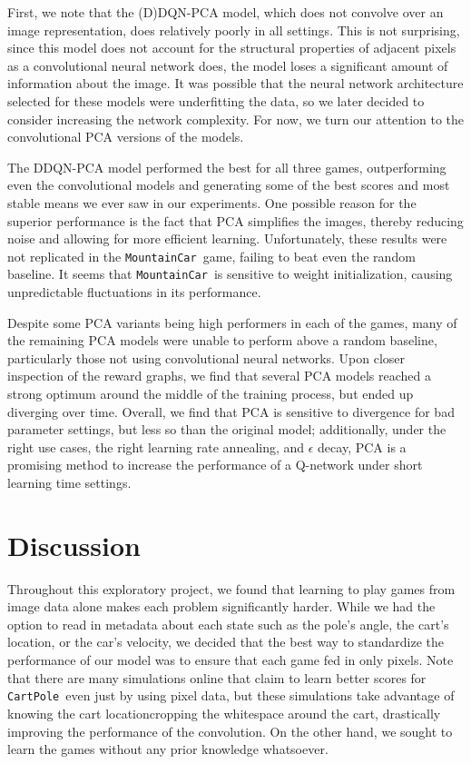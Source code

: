 \documentclass[11pt]{article}
\newcommand{\cp}{\texttt{CartPole}}
\newcommand{\mc}{\texttt{MountainCar}}
\begin{document}
First, we note that the (D)DQN-PCA model, which does not convolve over an image representation, does relatively poorly in all settings. This is not surprising, since this model does not account for the structural properties of adjacent pixels as a convolutional neural network does, the model loses a significant amount of information about the image. It was possible that the neural network architecture selected for these models were underfitting the data, so we later decided to consider increasing the network complexity. For now, we turn our attention to the convolutional PCA versions of the models.

The DDQN-PCA model performed the best for all three games, outperforming even the convolutional models and generating some of the best scores and most stable means we ever saw in our experiments. One possible reason for the superior performance is the fact that PCA simplifies the images, thereby reducing noise and allowing for more efficient learning. Unfortunately, these results were not replicated in the \mc~game, failing to beat even the random baseline. It seems that \mc~is sensitive to weight initialization, causing unpredictable fluctuations in its performance.


Despite some PCA variants being high performers in each of the games, many of the remaining PCA models were unable to perform above a random baseline, particularly those not using convolutional neural networks. Upon closer inspection of the reward graphs, we find that several PCA models reached a strong optimum around the middle of the training process, but ended up diverging over time. Overall, we find that PCA is sensitive to divergence for bad parameter settings, but less so than the original model; additionally, under the right use cases, the right learning rate annealing, and $\epsilon$ decay, PCA is a promising method to increase the performance of a Q-network under short learning time settings.

\section{Discussion}

Throughout this exploratory project, we found that learning to play games from image data alone makes each problem significantly harder. While we had the option to read in metadata about each state such as the pole's angle, the cart's location, or the car's velocity, we decided that the best way to standardize the performance of our model was to ensure that each game fed in only pixels. Note that there are many simulations online that claim to learn better scores for \cp~even just by using pixel data, but these simulations take advantage of knowing the cart locationcropping the whitespace around the cart, drastically improving the performance of the convolution. On the other hand, we sought to learn the games without any prior knowledge whatsoever.
\end{document}
